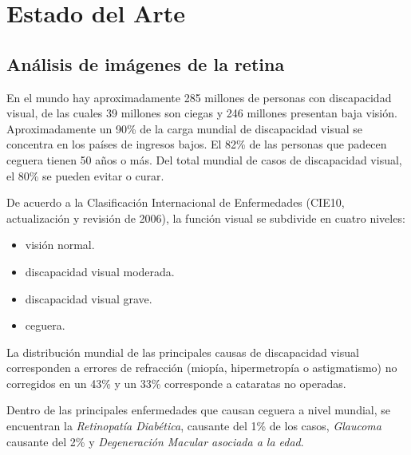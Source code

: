 \chapter{Estado del Arte} %

\label{Chapter2} %


\section{An\'alisis de im\'agenes de la retina}

En el mundo hay aproximadamente 285 millones de personas con discapacidad visual, de las cuales 39 millones son ciegas y 246 millones presentan baja visi\'on.\cite{oms:cifras} Aproximadamente un 90\% de la carga mundial de discapacidad visual se concentra en los pa\'ises de ingresos bajos.
El 82\% de las personas que padecen ceguera tienen 50 años o m\'as. Del total mundial de casos de discapacidad visual, el 80\%  se pueden evitar o curar.

De acuerdo a la Clasificaci\'on Internacional de Enfermedades (CIE10, actualizaci\'on y revisi\'on de 2006), la funci\'on visual se subdivide en cuatro niveles:
\begin{itemize}
\item visi\'on normal.
\item discapacidad visual moderada.
\item discapacidad visual grave.
\item ceguera.
\end{itemize}


La distribuci\'on mundial de las principales causas de discapacidad visual corresponden a errores de refracci\'on (miop\'ia, hipermetrop\'ia o astigmatismo) no corregidos en un 43\%  y un 33\% corresponde a cataratas no operadas.

Dentro de las principales enfermedades que causan ceguera a nivel mundial, se encuentran la \textit{Retinopat\'ia Diab\'etica}, causante del 1\% de los casos,\cite{oms:cifraCegueraPorRetinopatia} \textit{Glaucoma} causante del 2\% \cite{oms:cifras} y \textit{ Degeneraci\'on Macular asociada a la edad}. 

